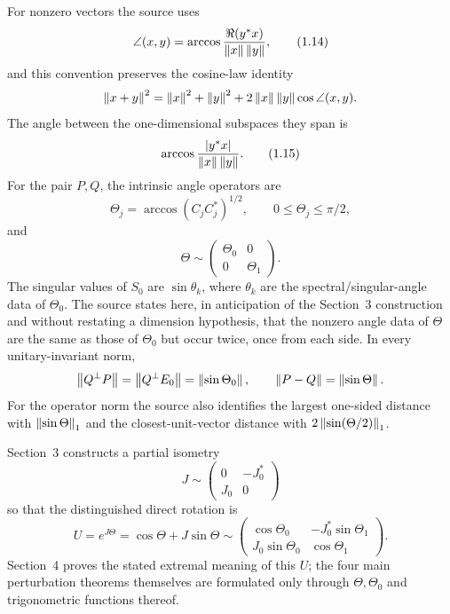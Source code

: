 For nonzero vectors the source uses
\begin{equation}
 \angle(x,y)=\arccos\frac{\Re(y^*x)}{\left\lVert x\right\rVert\left\lVert y\right\rVert},
 \tag{1.14}
\end{equation}
and this convention preserves the cosine-law identity
\[
 \left\lVert x+y\right\rVert^2=\left\lVert x\right\rVert^2+\left\lVert y\right\rVert^2
 +2\left\lVert x\right\rVert\left\lVert y\right\rVert\cos\angle(x,y).
\]
The angle between the one-dimensional subspaces they span is
\begin{equation}
 \arccos\frac{|y^*x|}{\left\lVert x\right\rVert\left\lVert y\right\rVert}.
 \tag{1.15}
\end{equation}
For the pair $P,Q$, the intrinsic angle operators are
\begin{equation}
 \Theta_j=\arccos(C_jC_j^*)^{1/2},\qquad 0\le\Theta_j\le\pi/2,
 \tag{1.16}
\end{equation}
and
\begin{equation}
 \Theta\sim\begin{pmatrix}\Theta_0&0\\0&\Theta_1\end{pmatrix}.
 \tag{1.17}
\end{equation}
The singular values of $S_0$ are $\sin\theta_k$, where $\theta_k$ are the spectral/singular-angle data of $\Theta_0$.  The source states here, in anticipation of the Section~3 construction and without restating a dimension hypothesis, that the nonzero angle data of $\Theta$ are the same as those of $\Theta_0$ but occur twice, once from each side.  In every unitary-invariant norm,
\[
 \left\lVert Q^\perp P\right\rVert=\left\lVert Q^\perp E_0\right\rVert=\left\lVert \sin\Theta_0\right\rVert,
 \qquad
 \left\lVert P-Q\right\rVert=\left\lVert \sin\Theta\right\rVert.
\]
For the operator norm the source also identifies the largest one-sided distance with $\left\lVert \sin\Theta\right\rVert_1$ and the closest-unit-vector distance with $2\left\lVert \sin(\Theta/2)\right\rVert_1$.

Section~3 constructs a partial isometry
\[
 J\sim\begin{pmatrix}0&-J_0^*\\J_0&0\end{pmatrix}
\]
so that the distinguished direct rotation is
\begin{equation}
 U=e^{J\Theta}=\cos\Theta+J\sin\Theta
 \sim
 \begin{pmatrix}
 \cos\Theta_0&-J_0^*\sin\Theta_1\\
 J_0\sin\Theta_0&\cos\Theta_1
 \end{pmatrix}.
 \tag{1.18}
\end{equation}
Section~4 proves the stated extremal meaning of this $U$; the four main perturbation theorems themselves are formulated only through $\Theta,\Theta_0$ and trigonometric functions thereof.

